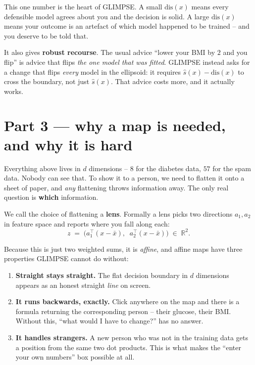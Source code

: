 \documentclass[11pt]{article}
\begin{document}
This one number is the heart of GLIMPSE. A small $\mathrm{dis}(x)$ means every
defensible model agrees about you and the decision is solid. A large $\mathrm{dis}(x)$
means your outcome is an artefact of which model happened to be trained -- and you
deserve to be told that.

It also gives \textbf{robust recourse}. The usual advice ``lower your BMI by $2$ and
you flip'' is advice that flips \emph{the one model that was fitted}. GLIMPSE instead
asks for a change that flips \emph{every} model in the ellipsoid: it requires
$\hat{s}(x) - \mathrm{dis}(x)$ to cross the boundary, not just $\hat s (x)$. That
advice costs more, and it actually works.

\section{Part 3 --- why a map is needed, and why it is hard}

Everything above lives in $d$ dimensions -- $8$ for the diabetes data, $57$ for the
spam data. Nobody can see that. To show it to a person, we need to flatten it onto a
sheet of paper, and \emph{any} flattening throws information away. The only real
question is \textbf{which} information.

We call the choice of flattening a \textbf{lens}. Formally a lens picks two directions
$a_1, a_2$ in feature space and reports where you fall along each:
\[
  z \;=\; \big( a_1^\top (x - \bar{x}),\;\; a_2^\top (x - \bar{x}) \big)
  \;\in\; \mathbb{R}^2 .
\]

Because this is just two weighted sums, it is \emph{affine}, and affine maps have three
properties GLIMPSE cannot do without:

\begin{enumerate}[leftmargin=*, itemsep=3pt]
  \item \textbf{Straight stays straight.} The flat decision boundary in $d$ dimensions
        appears as an honest straight \emph{line} on screen.
  \item \textbf{It runs backwards, exactly.} Click anywhere on the map and there is a
        formula returning the corresponding person -- their glucose, their BMI. Without
        this, ``what would I have to change?'' has no answer.
  \item \textbf{It handles strangers.} A new person who was not in the training data
        gets a position from the same two dot products. This is what makes the ``enter
        your own numbers'' box possible at all.
\end{enumerate}
\end{document}
